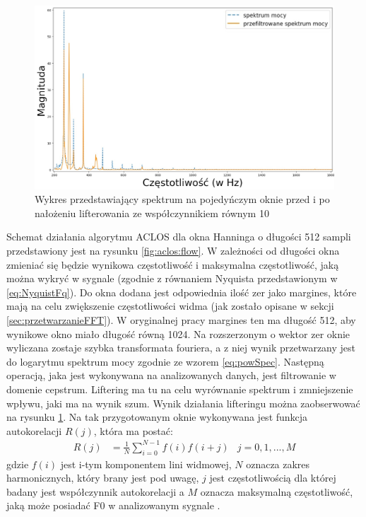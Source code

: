 \documentclass[12pt,a4paper,twoside]{mwart}
\begin{document}
\begin{figure}[h]
  \begin{center}
    \includegraphics[scale=0.33]{images/ACLOS/data_lifter_cropped.jpg} 
    \caption{Wykres przedstawiający spektrum na pojedyńczym oknie przed i po nałożeniu lifterowania ze współczynnikiem równym 10} 
    \label{fig:aclos:lifter}
  \end{center}
\end{figure}

Schemat działania algorytmu ACLOS dla okna Hanninga o długości 512 sampli przedstawiony jest na rysunku \ref{fig:aclos:flow}. W zależności od długości okna zmieniać się będzie wynikowa częstotliwość i maksymalna częstotliwość, jaką można wykryć w sygnale (zgodnie z równaniem Nyquista przedstawionym w \ref{eq:NyquistFq}). Do okna dodana jest odpowiednia ilość zer jako margines, które mają na celu zwiększenie częstotliwości widma (jak zostało opisane w sekcji \ref{sec:przetwarzanieFFT}). W oryginalnej pracy margines ten ma długość 512, aby wynikowe okno miało długość równą 1024. Na rozszerzonym o wektor zer oknie wyliczana zostaje szybka transformata fouriera, a z niej wynik przetwarzany jest do logarytmu spektrum mocy zgodnie ze wzorem \ref{eq:powSpec}. Następną operacją, jaka jest wykonywana na analizowanych danych, jest filtrowanie w domenie cepstrum. Liftering ma tu na celu wyrównanie spektrum i zmniejszenie wpływu, jaki ma na wynik szum. Wynik działania lifteringu można zaobserwować na rysunku \ref{fig:aclos:lifter}. Na tak przygotowanym oknie wykonywana jest funkcja autokorelacji $R(j)$, która ma postać:
\begin{align}\label{eq:Aclos:ACf}
  R(j)& = \frac{1}{N}\sum_{i=0}^{N-1}f(i)f(i + j)&
  j = 0, 1, ..., M
\end{align}
gdzie $f(i)$ jest i-tym komponentem lini widmowej, $N$ oznacza zakres harmonicznych, który brany jest pod uwagę, $j$ jest częstotliwością dla której badany jest współczynnik autokorelacji a $M$ oznacza maksymalną częstotliwość, jaką może posiadać F0 w analizowanym sygnale 
\cite[50-51]{Transcription:Quenneville:Thesis}.
\end{document}
